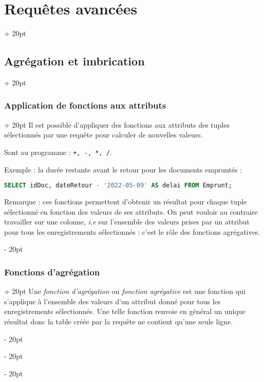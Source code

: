 \documentclass[a4paper, 12pt, twoside]{article}
\newcommand{\ind}[1][20pt]{\advance\leftskip + #1}
\newcommand{\deind}[1][20pt]{\advance\leftskip - #1}
\newenvironment{indt}[2][20pt]{#2 \par \ind[#1]}{\par \deind} %
\begin{document}
\begin{indt}{\section{Requêtes avancées}}
        \vspace{12pt}
        
        \begin{indt}{\subsection{Agrégation et imbrication}}
            \label{3.3}

            \begin{indt}{\subsubsection{Application de fonctions aux attributs}}
                Il est possible d'appliquer des fonctions aux attributs des tuples sélectionnés par une requête pour calculer de nouvelles valeurs.

                Sont au programme : \texttt{+, -, *, /}.

                Exemple : la durée restante avant le retour pour les documents empruntés :

                \begin{lstlisting}[language=SQL, xleftmargin=80pt]
SELECT idDoc, dateRetour - '2022-05-09' AS delai FROM Emprunt;\end{lstlisting}

                Remarque : ces fonctions permettent d'obtenir un résultat pour chaque tuple sélectionné en fonction des valeurs de ses attributs. On peut vouloir au contraire travailler sur une colonne, \textit{i.e} sur l'ensemble des valeurs prises par un attribut pour tous les enregistrements sélectionnés : c'est le rôle des fonctions agrégatives.
            \end{indt}

            \vspace{12pt}
            
            \begin{indt}{\subsubsection{Fonctions d'agrégation}}
                Une \textit{fonction d'agrégation} ou \textit{fonction agrégative} est une fonction qui s'applique à l'ensemble des valeurs d'un attribut donné pour tous les enregistrements sélectionnés. Une telle fonction renvoie en général un unique résultat donc la table créée par la requête ne contient qu'une seule ligne.


\end{indt}
\end{indt}
\end{indt}
\end{document}

